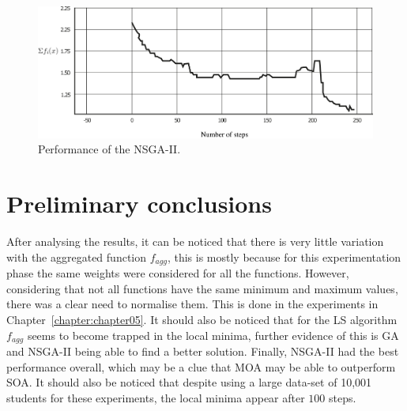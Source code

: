 \begin{figure}
    \centering
    \includegraphics[width=\textwidth]{images/multiobjective.png}
    \caption{Performance of the NSGA-II.}
    \label{fig:multiobjetivo}
\end{figure}

\section{Preliminary conclusions}

After analysing the results, it can be noticed that there is very little variation with the aggregated function $f_{agg}$, this is mostly because for this experimentation phase the same weights were considered for all the functions. However, considering that not all functions have the same minimum and maximum values, there was a clear need to normalise them. This is done in the experiments in Chapter~\ref{chapter:chapter05}. It should also be noticed that for the LS algorithm $f_{agg}$ seems to become trapped in the local minima, further evidence of this is GA and NSGA-II being able to find a better solution. Finally, NSGA-II had the best performance overall, which may be a clue that MOA may be able to outperform SOA. It should also be noticed that despite using a large data-set of {10,001} students for these experiments, the local minima appear after $100$ steps.